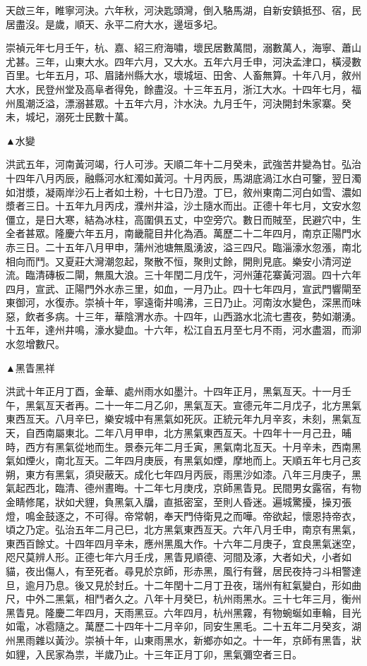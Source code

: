 \begin{pinyinscope}
天啟三年，睢寧河決。六年秋，河決匙頭灣，倒入駱馬湖，自新安鎮抵邳、宿，民居盡沒。是歲，順天、永平二府大水，邊垣多圮。

崇禎元年七月壬午，杭、嘉、紹三府海嘯，壞民居數萬間，溺數萬人，海寧、蕭山尤甚。三年，山東大水。四年六月，又大水。五年六月壬申，河決孟津口，橫浸數百里。七年五月，邛、眉諸州縣大水，壞城垣、田舍、人畜無算。十年八月，敘州大水，民登州堂及高阜者得免，餘盡沒。十三年五月，浙江大水。十四年七月，福州風潮泛溢，漂溺甚眾。十五年六月，汴水決。九月壬午，河決開封朱家寨。癸未，城圮，溺死士民數十萬。

▲水變

洪武五年，河南黃河竭，行人可涉。天順二年十二月癸未，武強苦井變為甘。弘治十四年八月丙辰，融縣河水紅濁如黃河。十月丙辰，馬湖底渦江水白可鑒，翌日濁如泔漿，凝兩岸沙石上者如土粉，十七日乃澄。丁巳，敘州東南二河白如雪、濃如漿者三日。十五年九月丙戌，濮州井溢，沙土隨水而出。正德十年七月，文安水忽僵立，是日大寒，結為冰柱，高圍俱五丈，中空旁穴。數日而賊至，民避穴中，生全者甚眾。隆慶六年五月，南畿龍目井化為酒。萬歷二十二年四月，南京正陽門水赤三日。二十五年八月甲申，蒲州池塘無風湧波，溢三四尺。臨淄濠水忽漲，南北相向而鬥。又夏莊大灣潮忽起，聚散不恒，聚則丈餘，開則見底。樂安小清河逆流。臨清磚板二閘，無風大浪。三十年閏二月戊午，河州蓮花寨黃河涸。四十六年四月，宣武、正陽門外水赤三里，如血，一月乃止。四十七年四月，宣武門響閘至東御河，水復赤。崇禎十年，寧遠衛井鳴沸，三日乃止。河南汝水變色，深黑而味惡，飲者多病。十三年，華陰渭水赤。十四年，山西潞水北流七晝夜，勢如潮湧。十五年，達州井鳴，濠水變血。十六年，松江自五月至七月不雨，河水盡涸，而泖水忽增數尺。

▲黑眚黑祥

洪武十年正月丁酉，金華、處州雨水如墨汁。十四年正月，黑氣亙天。十一月壬午，黑氣亙天者再。二十一年二月乙卯，黑氣亙天。宣德元年二月戊子，北方黑氣東西亙天。八月辛巳，樂安城中有黑氣如死灰。正統元年九月辛亥，未刻，黑氣亙天，自西南屬東北。二年八月甲申，北方黑氣東西亙天。十四年十一月己丑，晡時，西方有黑氣從地而生。景泰元年二月壬寅，黑氣南北亙天。十月辛未，西南黑氣如煙火，南北亙天。二年四月庚辰，有黑氣如煙，摩地而上。天順五年七月己亥朔，東方有黑氣，須臾蔽天。成化七年四月丙辰，雨黑沙如漆。八年三月庚子，黑氣起西北，臨清、德州晝晦。十二年七月庚戌，京師黑眚見。民間男女露宿，有物金睛修尾，狀如犬貍，負黑氣入牖，直抵密室，至則人昏迷。遍城驚擾，操刃張燈，鳴金鼓逐之，不可得。帝常朝，奉天門侍衛見之而嘩。帝欲起，懷恩持帝衣，頃之乃定。弘治五年二月己巳，北方黑氣東西亙天。六年八月壬申，南京有黑氣，東西百餘丈。十四年四月辛未，應州黑風大作。十六年二月庚子，宜良黑氣迷空，咫尺莫辨人形。正德七年六月壬戌，黑眚見順德、河間及涿，大者如犬，小者如貓，夜出傷人，有至死者。尋見於京師，形赤黑，風行有聲，居民夜持刁斗相警達旦，逾月乃息。後又見於封丘。十二年閏十二月丁丑夜，瑞州有紅氣變白，形如曲尺，中外二黑氣，相鬥者久之。八年十月癸巳，杭州雨黑水。三十七年三月，衡州黑眚見。隆慶二年四月，天雨黑豆。六年四月，杭州黑霧，有物蜿蜒如車輪，目光如電，冰雹隨之。萬歷二十四年十二月辛卯，同安生黑毛。二十五年二月癸亥，湖州黑雨雜以黃沙。崇禎十年，山東雨黑水，新鄉亦如之。十一年，京師有黑眚，狀如貍，入民家為祟，半歲乃止。十三年正月丁卯，黑氣彌空者三日。


\end{pinyinscope}
